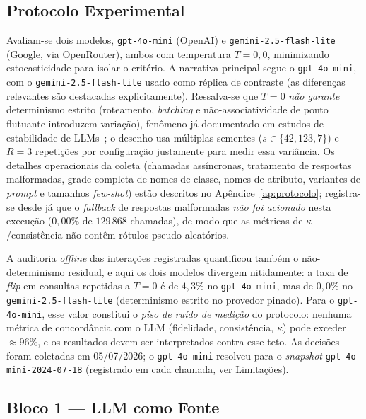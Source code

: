 \documentclass[12pt,a4paper]{article}
\begin{document}
\subsection{Protocolo Experimental}

Avaliam-se dois modelos, \texttt{gpt-4o-mini} (OpenAI) e \texttt{gemini-2.5-flash-lite}
(Google, via OpenRouter), ambos com temperatura $T = 0{,}0$, minimizando estocasticidade
para isolar o critério. A narrativa principal segue o \texttt{gpt-4o-mini}, com o
\texttt{gemini-2.5-flash-lite} usado como réplica de contraste (as diferenças relevantes
são destacadas explicitamente). Ressalva-se que $T=0$ \emph{não garante} determinismo
estrito (roteamento, \emph{batching} e não-associatividade de ponto flutuante introduzem
variação), fenômeno já documentado em estudos de estabilidade de
LLMs~\cite{atilLLMStability2024, windischOneRun2026}; o desenho usa múltiplas sementes
($s \in \{42, 123, 7\}$) e $R = 3$ repetições por configuração justamente para medir essa
variância. Os detalhes operacionais da coleta (chamadas assíncronas, tratamento de
respostas malformadas, grade completa de nomes de classe, nomes de atributo, variantes de
\emph{prompt} e tamanhos \emph{few-shot}) estão descritos no Apêndice~\ref{ap:protocolo};
registra-se desde já que o \emph{fallback} de respostas malformadas \emph{não foi
acionado} nesta execução ($0{,}00\%$ de $129\,868$ chamadas), de modo que as métricas de
$\kappa$/consistência não contêm rótulos pseudo-aleatórios.

A auditoria \emph{offline} das interações registradas quantificou também o não-determinismo
residual, e aqui os dois modelos divergem nitidamente: a taxa de \emph{flip} em consultas
repetidas a $T=0$ é de $4{,}3\%$ no \texttt{gpt-4o-mini}, mas de $0{,}0\%$ no
\texttt{gemini-2.5-flash-lite} (determinismo estrito no provedor pinado). Para o
\texttt{gpt-4o-mini}, esse valor constitui o \emph{piso de ruído de medição} do protocolo:
nenhuma métrica de concordância com o LLM (fidelidade, consistência, $\kappa$) pode exceder
$\approx 96\%$, e os resultados devem ser interpretados contra esse teto. As decisões foram
coletadas em 05/07/2026; o \texttt{gpt-4o-mini} resolveu para o \emph{snapshot}
\texttt{gpt-4o-mini-2024-07-18} (registrado em cada chamada, ver Limitações).

\subsection{Bloco 1 — LLM como Fonte}
\end{document}

